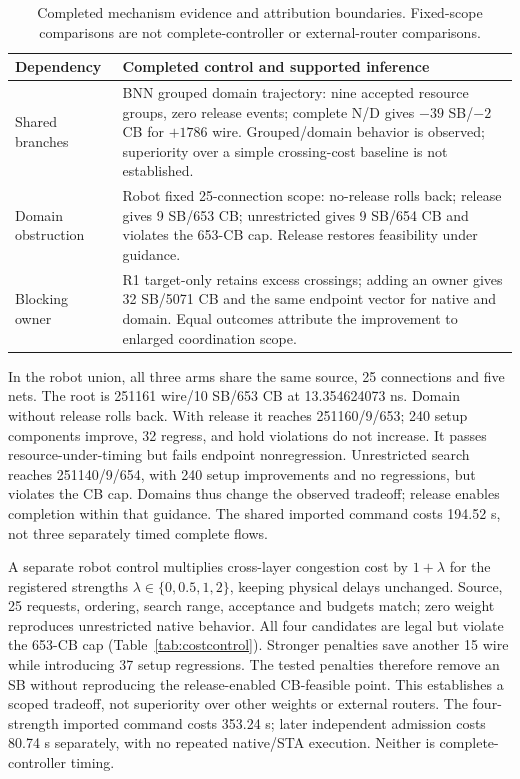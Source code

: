 \documentclass[conference,10pt]{IEEEtran}
\begin{document}
\begin{table}[t]
\centering\footnotesize\setlength{\tabcolsep}{3pt}
\caption{Completed mechanism evidence and attribution boundaries. Fixed-scope comparisons are not complete-controller or external-router comparisons.}
\label{tab:attribution}
\begin{tabular}{p{}p{}}\hline
Dependency & Completed control and supported inference\\\hline
Shared branches & BNN grouped domain trajectory: nine accepted resource groups, zero release events; complete N/D gives $-39$ SB/$-2$ CB for $+1786$ wire. Grouped/domain behavior is observed; superiority over a simple crossing-cost baseline is not established.\\
Domain obstruction & Robot fixed 25-connection scope: no-release rolls back; release gives 9 SB/653 CB; unrestricted gives 9 SB/654 CB and violates the 653-CB cap. Release restores feasibility under guidance.\\
Blocking owner & R1 target-only retains excess crossings; adding an owner gives 32 SB/5071 CB and the same endpoint vector for native and domain. Equal outcomes attribute the improvement to enlarged coordination scope.\\\hline
\end{tabular}
\end{table}

In the robot union, all three arms share the same source, 25 connections and five nets. The root is 251161 wire/10 SB/653 CB at 13.354624073 ns. Domain without release rolls back. With release it reaches 251160/9/653; 240 setup components improve, 32 regress, and hold violations do not increase. It passes resource-under-timing but fails endpoint nonregression. Unrestricted search reaches 251140/9/654, with 240 setup improvements and no regressions, but violates the CB cap. Domains thus change the observed tradeoff; release enables completion within that guidance. The shared imported command costs 194.52 s, not three separately timed complete flows.

A separate robot control multiplies cross-layer congestion cost by $1+\lambda$ for the registered strengths $\lambda\in\{0,0.5,1,2\}$, keeping physical delays unchanged. Source, 25 requests, ordering, search range, acceptance and budgets match; zero weight reproduces unrestricted native behavior. All four candidates are legal but violate the 653-CB cap (Table~\ref{tab:costcontrol}). Stronger penalties save another 15 wire while introducing 37 setup regressions. The tested penalties therefore remove an SB without reproducing the release-enabled CB-feasible point. This establishes a scoped tradeoff, not superiority over other weights or external routers. The four-strength imported command costs 353.24 s; later independent admission costs 80.74 s separately, with no repeated native/STA execution. Neither is complete-controller timing.
\end{document}
